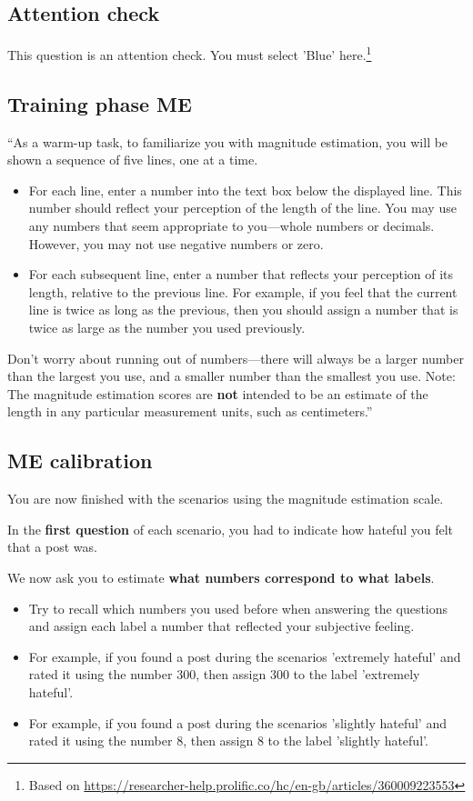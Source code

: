 \documentclass[a4paper]{article}
\begin{document}
\subsection{Attention check}
This question is an attention check. You must select 'Blue' here.\footnote{Based on \url{https://researcher-help.prolific.co/hc/en-gb/articles/360009223553}}

\subsection{Training phase ME}
“As a warm-up task, to familiarize you with magnitude estimation, you will be shown a sequence of five lines, one at a time.
\begin{itemize}
    \item For each line, enter a number into the text box below the displayed line. This number should reflect your perception of the length of the line. You may use any numbers that seem appropriate to you—whole numbers or decimals. However, you may not use negative numbers or zero.
    \item For each subsequent line, enter a number that reflects your perception of its length, relative to the previous line. For example, if you feel that the current line is twice as long as the previous, then you should assign a number that is twice as large as the number you used previously.
\end{itemize}

Don’t worry about running out of numbers—there will always be a larger number than the largest you use, and a smaller number than the smallest you use. Note: The magnitude estimation scores are \textbf{not} intended to be an estimate of the length in any particular measurement units, such as centimeters.” \cite{maddalena2017crowdsourcing}

\subsection{ME calibration}
You are now finished with the scenarios using the magnitude estimation scale.

In the \textbf{first question} of each scenario, you had to indicate how hateful you felt that a post was.

We now ask you to estimate \textbf{what numbers correspond to what labels}.
\begin{itemize}
    \item Try to recall which numbers you used before when answering the questions and assign each label a number that reflected your subjective feeling.
    \item For example, if you found a post during the scenarios 'extremely hateful' and rated it using the number 300, then assign 300 to the label 'extremely hateful'.
    \item For example, if you found a post during the scenarios 'slightly hateful' and rated it using the number 8, then assign 8 to the label 'slightly hateful'.
\end{itemize}
\end{document}
